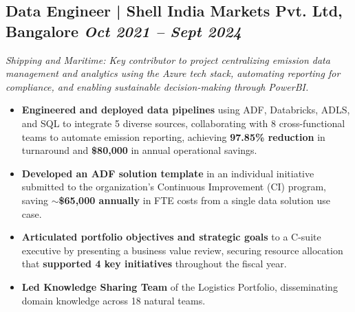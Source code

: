 \documentclass[10pt,a4paper]{article}
\begin{document}
\subsection{Data Engineer | Shell India Markets Pvt. Ltd, Bangalore \hfill
\textit{Oct 2021 -- Sept 2024}}
\textit{Shipping and Maritime: Key contributor to project centralizing emission data management and analytics using the Azure tech stack, automating reporting for compliance, and enabling sustainable decision-making through PowerBI.}
\begin{itemize}
    \item \textbf{Engineered and deployed data pipelines} using ADF, Databricks, ADLS, and SQL to integrate 5 diverse sources, collaborating with 8 cross-functional teams to automate emission reporting, achieving \textbf{97.85\% reduction} in turnaround and \textbf{\$80,000} in annual operational savings.
    \item \textbf{Developed an ADF solution template} in an individual initiative submitted to the organization's Continuous Improvement (CI) program, saving \textbf{$\sim$\$65,000 annually} in FTE costs from a single data solution use case.
    \item \textbf{Articulated portfolio objectives and strategic goals} to a C-suite executive by presenting a business value review, securing resource allocation that \textbf{supported 4 key initiatives} throughout the fiscal year.
    \item \textbf{Led Knowledge Sharing Team} of the Logistics Portfolio, disseminating domain knowledge across 18 natural teams.
\end{itemize}
\vspace{0.3em}
\end{document}

